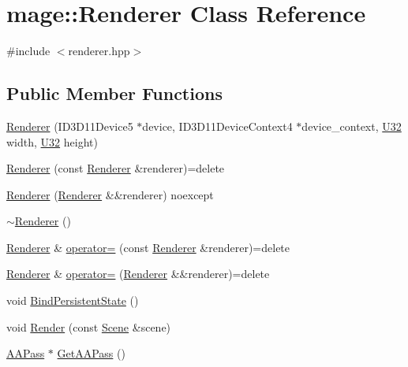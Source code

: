 \hypertarget{classmage_1_1_renderer}{}\section{mage\+:\+:Renderer Class Reference}
\label{classmage_1_1_renderer}


{\ttfamily \#include $<$renderer.\+hpp$>$}

\subsection*{Public Member Functions}
\begin{DoxyCompactItemize}
\item 
\hyperlink{classmage_1_1_renderer_a4efd88a30f3ad43cf5d490d62259f921}{Renderer} (I\+D3\+D11\+Device5 $\ast$device, I\+D3\+D11\+Device\+Context4 $\ast$device\+\_\+context, \hyperlink{namespacemage_a41c104c036fba3756a74e19f793eeaa1}{U32} width, \hyperlink{namespacemage_a41c104c036fba3756a74e19f793eeaa1}{U32} height)
\item 
\hyperlink{classmage_1_1_renderer_acd6b509da2bd7e7d764b45b912fe5298}{Renderer} (const \hyperlink{classmage_1_1_renderer}{Renderer} \&renderer)=delete
\item 
\hyperlink{classmage_1_1_renderer_a50dcb6da913089a97475b2d1c0d0062e}{Renderer} (\hyperlink{classmage_1_1_renderer}{Renderer} \&\&renderer) noexcept
\item 
\hyperlink{classmage_1_1_renderer_a997e041f28cc71d069d1ab7d29fe6ced}{$\sim$\+Renderer} ()
\item 
\hyperlink{classmage_1_1_renderer}{Renderer} \& \hyperlink{classmage_1_1_renderer_a2762ead5f771ae95e4293cd7eb1a2834}{operator=} (const \hyperlink{classmage_1_1_renderer}{Renderer} \&renderer)=delete
\item 
\hyperlink{classmage_1_1_renderer}{Renderer} \& \hyperlink{classmage_1_1_renderer_aa381bb89bffdc8ea2d8e3625e28cd28a}{operator=} (\hyperlink{classmage_1_1_renderer}{Renderer} \&\&renderer)=delete
\item 
void \hyperlink{classmage_1_1_renderer_a0de9d7d913e5f92a75ff2cc075601b9d}{Bind\+Persistent\+State} ()
\item 
void \hyperlink{classmage_1_1_renderer_a6dba3f3b9a1d3d8ed84d6ea3bec17058}{Render} (const \hyperlink{classmage_1_1_scene}{Scene} \&scene)
\item 
\hyperlink{classmage_1_1_a_a_pass}{A\+A\+Pass} $\ast$ \hyperlink{classmage_1_1_renderer_a52fd71822fe54161ad505a0361ec6c75}{Get\+A\+A\+Pass} ()

\end{DoxyCompactItemize}
